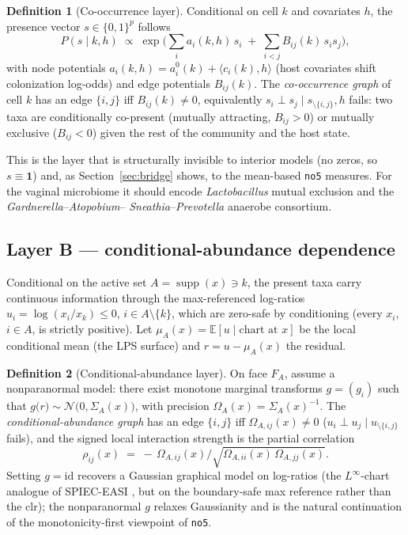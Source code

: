 \documentclass[11pt]{article}
\theoremstyle{definition}
\newtheorem{definition}{Definition}[section]
\theoremstyle{plain}
\theoremstyle{remark}
\newcommand{\Linf}{L^{\infty}}
\newcommand{\E}{\mathbb{E}}
\newcommand{\supp}{\operatorname{supp}}
\newcommand{\1}{\mathbf{1}}
\newcommand{\Prec}{\Omega}
\newcommand{\Edge}{B}
\begin{document}
\begin{definition}[Co-occurrence layer]\label{def:layerA}
Conditional on cell $k$ and covariates $h$, the presence vector $s\in\{0,1\}^{p}$
follows
\[
  P(s\mid k,h)\;\propto\;
  \exp\!\Big(\textstyle\sum_{i} a_i(k,h)\,s_i
            \;+\;\sum_{i<j} \Edge_{ij}(k)\,s_i s_j\Big),
\]
with node potentials $a_i(k,h)=a_i^0(k)+\langle c_i(k),h\rangle$ (host covariates
shift colonization log-odds) and edge potentials $\Edge_{ij}(k)$. The
\emph{co-occurrence graph} of cell $k$ has an edge $\{i,j\}$ iff
$\Edge_{ij}(k)\neq0$, equivalently $s_i\perp s_j\mid s_{\setminus\{i,j\}},h$ fails:
two taxa are conditionally co-present (mutually attracting, $\Edge_{ij}>0$) or
mutually exclusive ($\Edge_{ij}<0$) given the rest of the community and the host
state.
\end{definition}

This is the layer that is structurally invisible to interior models (no zeros, so
$s\equiv\1$) and, as Section~\ref{sec:bridge} shows, to the mean-based
\texttt{no5} measures. For the vaginal microbiome it should encode
\emph{Lactobacillus} mutual exclusion and the \emph{Gardnerella}--\emph{Atopobium}--%
\emph{Sneathia}--\emph{Prevotella} anaerobe consortium.

\subsection{Layer B --- conditional-abundance dependence}\label{sec:layerB}
Conditional on the active set $A=\supp(x)\ni k$, the present taxa carry
continuous information through the max-referenced log-ratios
$u_i=\log(x_i/x_k)\le0$, $i\in A\setminus\{k\}$, which are zero-safe by
conditioning (every $x_i$, $i\in A$, is strictly positive). Let
$\mu_A(x)=\E[u\mid \text{chart at }x]$ be the local conditional mean (the LPS
surface) and $r=u-\mu_A(x)$ the residual.

\begin{definition}[Conditional-abundance layer]\label{def:layerB}
On face $F_A$, assume a nonparanormal model: there exist monotone marginal
transforms $g=(g_i)$ such that
$g\big(r\big)\sim\mathcal{N}\!\big(0,\Sigma_A(x)\big)$, with precision
$\Prec_A(x)=\Sigma_A(x)^{-1}$. The \emph{conditional-abundance graph} has an edge
$\{i,j\}$ iff $\Prec_{A,ij}(x)\neq0$ ($u_i\perp u_j\mid u_{\setminus\{i,j\}}$
fails), and the signed local interaction strength is the partial correlation
\[
  \rho_{ij}(x)\;=\;-\,\Prec_{A,ij}(x)\big/\sqrt{\Prec_{A,ii}(x)\,\Prec_{A,jj}(x)} .
\]
Setting $g=\mathrm{id}$ recovers a Gaussian graphical model on log-ratios (the
$\Linf$-chart analogue of SPIEC-EASI \cite{spieceasi}, but on the boundary-safe
max reference rather than the clr); the nonparanormal $g$ relaxes Gaussianity and
is the natural continuation of the monotonicity-first viewpoint of \texttt{no5}.
\end{definition}
\end{document}
